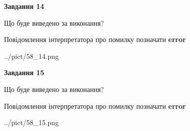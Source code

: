 \documentclass[11pt, ukrainian]{article}
\begin{document}
{\begin {large}
{\begin {center}\textbf{Завдання 14}\end {center}}\par
Що буде виведено за виконання? \par
Повідомлення інтерпретатора про помилку позначати \textbf{error}

\begin{center}
	{../pict/58_14.png}
\end{center}
\newpage

{\begin {center}\textbf{Завдання 15}\end {center}}\par
Що буде виведено за виконання? \par
Повідомлення інтерпретатора про помилку позначати \textbf{error}

\begin{center}
	{../pict/58_15.png}
\end{center}
\newpage

\end {large}}
\end{document}
